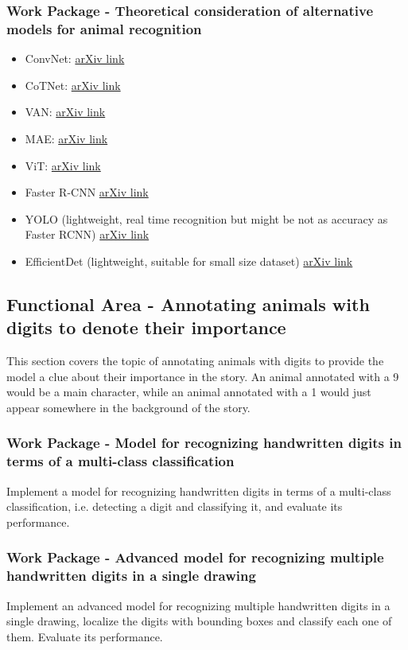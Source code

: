 \subsubsection{Work Package - Theoretical consideration of alternative models for animal recognition}
\begin{itemize}
	\item ConvNet: \href{https://arxiv.org/abs/2201.03545}{arXiv link}
	\item CoTNet: \href{https://arxiv.org/abs/2107.12292}{arXiv link}
	\item VAN: \href{https://arxiv.org/abs/2202.09741}{arXiv link}
	\item MAE: \href{https://arxiv.org/abs/2111.06377}{arXiv link}
	\item ViT: \href{https://arxiv.org/abs/2010.11929}{arXiv link}
	\item Faster R-CNN \href{https://arxiv.org/abs/1506.01497}{arXiv link}
	\item YOLO (lightweight, real time recognition but might be not as accuracy as Faster RCNN) \href{https://arxiv.org/abs/1506.02640}{arXiv link}
	\item EfficientDet (lightweight, suitable for small size dataset) \href{https://arxiv.org/abs/1911.09070}{arXiv link}
\end{itemize}

\subsection{Functional Area - Annotating animals with digits to denote their importance}
This section covers the topic of annotating animals with digits to provide the model a clue about their importance in the story. An animal annotated with a 9 would be a main character, while an animal annotated with a 1 would just appear somewhere in the background of the story.

\subsubsection{Work Package - Model for recognizing handwritten digits in terms of a multi-class classification}
Implement a model for recognizing handwritten digits in terms of a multi-class classification, i.e. detecting a digit and classifying it, and evaluate its performance.

\subsubsection{Work Package - Advanced model for recognizing multiple handwritten digits in a single drawing}
Implement an advanced model for recognizing multiple handwritten digits in a single drawing, localize the digits with bounding boxes and classify each one of them. Evaluate its performance.

